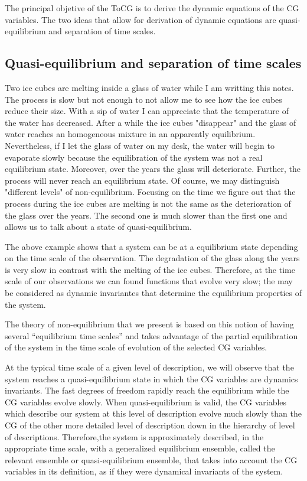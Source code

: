 \documentclass[a4paper,openright,12pt]{book}
\begin{document}
The principal objetive of the ToCG is to derive the dynamic equations of the CG variables. The two ideas that allow for derivation of dynamic equations are quasi-equilibrium and separation of time scales.

\subsection{Quasi-equilibrium and separation of time scales}
Two ice cubes are melting inside a glass of water while I am writting this notes. 
The process is slow but not enough to not allow me to see how the ice cubes reduce their size. 
With a sip of water I can appreciate that the temperature of the water has decreased. 
After a while the ice cubes "disappear" and the glass of water reaches an homogeneous mixture in an apparently equilibrium. 
Nevertheless, if I let the glass of water on my desk, the water will begin to evaporate slowly because the equilibration of the system was not a real equilibrium state. 
Moreover, over the years the glass will deteriorate. 
Further, the process will never reach an equilibrium state.
Of course, we may distinguish "different levels" of non-equilibrium. 
Focusing on the time we figure out that the process during the ice cubes are melting is not the same as the deterioration of the glass over the years. The second one is much slower than the first one and allows us to talk about a state of quasi-equilibrium. 

The above example shows that a system can be at a equilibrium state depending on the time scale of the observation. The degradation of the glass along the years is very slow in contrast with the melting of the ice cubes. Therefore, at the time scale of our observations we can found functions that evolve very slow; the may be considered as dynamic invariantes that determine the equilibrium properties of the system. 

The theory of non-equilibrium that we present is based on this notion of
having several “equilibrium time scales” and takes advantage of the partial equilibration of
the system in the time scale of evolution of the selected CG variables.

At the typical time scale of a given level of description, we will observe that the system reaches a quasi-equilibrium state in which the CG variables are dynamics invariants. 
The fast degrees of freedom rapidly reach the equilibrium while the CG variables evolve slowly. 
When quasi-equilibrium is valid, the CG variables which describe our system at this level of description evolve much slowly than the CG of the other more detailed level of description down in the hierarchy of level of descriptions. 
Therefore,the system is approximately described, in the appropriate time scale, with a generalized equilibrium ensemble, called the relevant ensemble or quasi-equilibrium ensemble, that takes into account the CG variables in its definition, as if they were dynamical invariants of the system.
\end{document}
